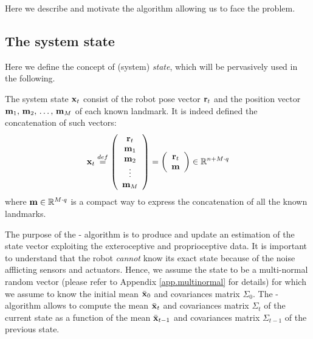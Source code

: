 Here we describe and motivate the \EKF{} algorithm allowing us to face the \SLAM{} problem.

\subsection{The system state}
	Here we define the concept of (system) \emph{state}, which will be pervasively used in the following.
	
	The system state $\boldsymbol{\mathrm{{x}}}_t$ consist of the robot pose vector $\boldsymbol{\mathrm{{r}}}_t$ and the position vector $\boldsymbol{\mathrm{{m}}}_{1},\, \boldsymbol{\mathrm{{m}}}_{2},\, \ldots,\, \boldsymbol{\mathrm{{m}}}_{M}$ of each known landmark. It is indeed defined the concatenation of such vectors:
	\[
		\boldsymbol{\mathrm{{x}}}_t \stackrel{def}{=}
		\left(\begin{array}{c}
			\boldsymbol{\mathrm{{r}}}_t \\ \boldsymbol{\mathrm{{m}}}_{1} \\ \boldsymbol{\mathrm{{m}}}_{2} \\ \vdots \\ \boldsymbol{\mathrm{{m}}}_{M}
		\end{array}\right)
		=
		\left(\begin{array}{c}
			\boldsymbol{\mathrm{{r}}}_t \\ \boldsymbol{\mathrm{{m}}}
		\end{array}\right)
		\in \mathbb{R}^{n + M \cdot q}
	\]
	where $\boldsymbol{\mathrm{{m}}} \in \mathbb{R}^{M \cdot q}$ is a compact way to express the concatenation of all the known landmarks.
	
	The purpose of the \EKF-\SLAM{} algorithm is to produce and update an estimation of the state vector exploiting the exteroceptive and proprioceptive data. 
	It is important to understand that the robot \emph{cannot} know its exact state because of the noise afflicting sensors and actuators.
	Hence, we assume the state to be a multi-normal random vector (please refer to Appendix \ref{app.multinormal} for details) for which we assume to know the initial mean $\bar{\boldsymbol{\mathrm{{x}}}}_0$ and covariances matrix $\Sigma_0$.
	The \EKF-\SLAM{} algorithm allows to compute the mean $\bar{\boldsymbol{\mathrm{{x}}}}_t$ and covariances matrix $\Sigma_t$ of the current state as a function of the mean $\bar{\boldsymbol{\mathrm{{x}}}}_{t - 1}$ and covariances matrix $\Sigma_{t - 1}$ of the previous state.
	